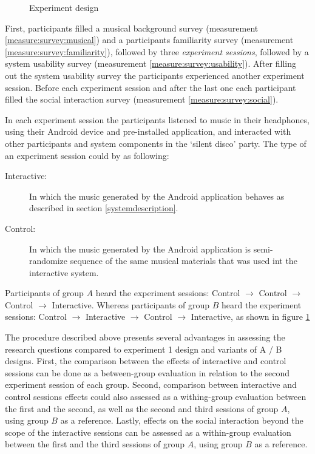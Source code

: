 \documentclass[a4paper,11pt]{article}
\newcommand{\definition}[1]{\emph{#1}}
\begin{document}
{\begin{figure}[!htb]
	\centering
	\def\svgwidth{0.9\textwidth}
  	
	\caption{Experiment design}\label{fig:experiment}
\end{figure}

First, participants filled a musical background survey (measurement \ref{measure:survey:musical}) and a participants familiarity survey (measurement \ref{measure:survey:familiarity}), followed by three \definition{experiment sessions}, followed by a system usability survey (measurement \ref{measure:survey:usability}).
After filling out the system usability survey the participants experienced another experiment session.
Before each experiment session and after the last one each participant filled the social interaction survey (measurement \ref{measure:survey:social}).

In each experiment session the participants listened to music in their headphones, using their Android device and pre-installed application, and interacted with other participants and system components in the `silent disco' party.
The type of an experiment session could by as following:

\begin{description}
	\item[Interactive:] In which the music generated by the Android application behaves as described in section \ref{systemdescription}.
	\item[Control:] In which the music generated by the Android application is semi-randomize sequence of the same musical materials that was used int the interactive system.
\end{description}

Participants of group $A$ heard the experiment sessions: Control $\rightarrow$ Control $\rightarrow$ Control $\rightarrow$ Interactive.
Whereas participants of group $B$ heard the experiment sessions: Control $\rightarrow$ Interactive $\rightarrow$ Control $\rightarrow$ Interactive, as shown in figure \ref{fig:experiment}

The procedure described above presents several advantages in assessing the research questions compared to experiment 1 design and variants of A / B designs.
First, the comparison between the effects of interactive and control sessions can be done as a between-group evaluation in relation to the second experiment session of each group.
Second, comparison between interactive and control sessions effects could also assessed as a withing-group evaluation between the first and the second, as well as the second and third sessions of group $A$, using group $B$ as a reference.
Lastly, effects on the social interaction beyond the scope of the interactive sessions can be assessed as a within-group evaluation between the first and the third sessions of group $A$, using group $B$ as a reference.

}
\end{document}
